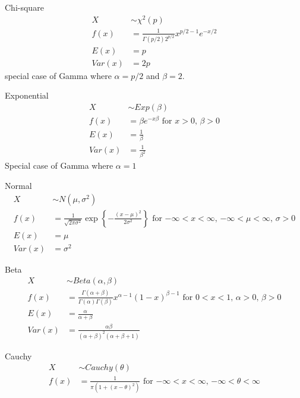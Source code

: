 \documentclass[avery5388,grid,frame]{flashcards}
\begin{document}
\begin{flashcard}[Distribution]{Chi-square}
\bigskip\bigskip\bigskip
{\begin{align*}
X&\sim \chi^2(p)\\
f(x)&=\frac{1}{\Gamma(p/2)2^{p/2}}x^{p/2-1}e^{-x/2}\\
E(x)&=p\\
Var(x)&=2p
\end{align*}}
special case of Gamma where $\alpha=p/2$ and $\beta=2$.
\end{flashcard}
\begin{flashcard}[Distribution]{Exponential}
\bigskip\bigskip\bigskip
{\begin{align*}
X&\sim Exp(\beta)\\
f(x)&=\beta e^{-x\beta}\textrm{  for $x>0$, $\beta>0$}\\
E(x)&=\frac{1}{\beta}\\
Var(x)&=\frac{1}{\beta^2}
\end{align*}}
Special case of Gamma where $\alpha=1$
\end{flashcard}
\begin{flashcard}[Distribution]{Normal}
\bigskip\bigskip\bigskip
{\begin{align*}
X&\sim N(\mu,\sigma^2)\\
f(x)&=\frac{1}{\sqrt{2\pi\sigma^2}}\exp\left\{-\frac{(x-\mu)^2}{2\sigma^2}\right\}\textrm{  for $-\infty< x<\infty$, $-\infty<\mu<\infty$, $\sigma>0$}\\
E(x)&=\mu\\
Var(x)&=\sigma^2
\end{align*}}
\end{flashcard}
\begin{flashcard}[Distribution]{Beta}
\bigskip\bigskip\bigskip
{\begin{align*}
X&\sim Beta(\alpha,\beta)\\
f(x)&=\frac{\Gamma(\alpha+\beta)}{\Gamma(\alpha)\Gamma(\beta)}x^{\alpha-1}(1-x)^{\beta-1}\textrm{  for $0<x<1$, $\alpha>0$, $\beta>0$}\\
E(x)&=\frac{\alpha}{\alpha+\beta}\\
Var(x)&=\frac{\alpha\beta}{(\alpha+\beta)^2(\alpha+\beta+1)}
\end{align*}}
\end{flashcard}
\begin{flashcard}[Distribution]{Cauchy}
\bigskip\bigskip\bigskip
{\begin{align*}
X&\sim Cauchy(\theta)\\
f(x)&=\frac{1}{\pi(1+(x-\theta)^2)}\textrm{  for $-\infty<x<\infty$, $-\infty<\theta<\infty$}
\end{align*}}
\end{flashcard}
\end{document}
